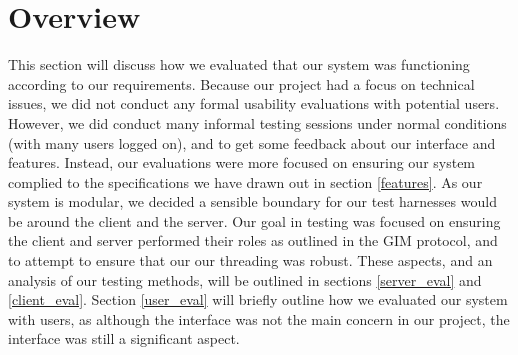 \section{Overview}

This section will discuss how we evaluated that our system was functioning according to our requirements. Because our project had a focus on technical issues, we did not conduct any formal usability evaluations with potential users. However, we did conduct many informal testing sessions under normal conditions (with many users logged on), and to get some feedback about our interface and features. Instead, our evaluations were more focused on ensuring our system complied to the specifications we have drawn out in section \ref{features}. As our system is modular, we decided a sensible boundary for our test harnesses would be around the client and the server. Our goal in testing was focused on ensuring the client and server performed their roles as outlined in the GIM protocol, and to attempt to ensure that our our threading was robust.  These aspects, and an analysis of our testing methods, will be outlined in sections \ref{server_eval} and \ref{client_eval}. Section \ref{user_eval} will briefly outline how we evaluated our system with users, as although the interface was not the main concern in our project, the interface was still a significant aspect.
